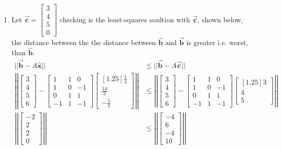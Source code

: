 \documentclass[letter,11pt]{article}
\theoremstyle{definition}
\begin{document}
\begin{tcolorbox}[boxrule=1mm,enhanced jigsaw, breakable,before=\hfill,after=\hfill,adjusted title={Problem 5 solutions}]
\begin{enumerate}[label = \roman*.]
        \item Let $\vec{\boldsymbol{c}} = \begin{bmatrix} 3 \\ 4 \\ 5 \\ 0 \end{bmatrix}$ checking is the least-squares soultion with $\vec{\boldsymbol{c}}$, shown below, the distance between the the distance between $\hat{\boldsymbol{b}}$ and $\vec{\boldsymbol{b}}$ is greater i.e. worst, than $\hat{\boldsymbol{b}}$.
        \begin{align*}
            ||\vec{\boldsymbol{b}}-A\hat{\boldsymbol{x}}|| &\leq ||\vec{\boldsymbol{b}} - A\vec{\boldsymbol{c}}||\\
            \left|\left| \begin{bmatrix} 3 \\ 4 \\ 5 \\ 6 \end{bmatrix} - \begin{bmatrix}1 & 1 & 0 \\ 1 & 0 & -1 \\ 0 & 1 & 1 \\ -1 & 1 & -1 \end{bmatrix}\begin{bmatrix}[1.25] \frac{1}{3} \\ \frac{14}{3} \\ -\frac{5}{3} \end{bmatrix} \right|\right| & \leq \left|\left| \begin{bmatrix} 3 \\ 4 \\ 5 \\ 6 \end{bmatrix} - \begin{bmatrix}1 & 1 & 0 \\ 1 & 0 & -1 \\ 0 & 1 & 1 \\ -1 & 1 & -1 \end{bmatrix}\begin{bmatrix}[1.25] 3 \\ 4 \\ 5 \end{bmatrix} \right|\right| \\ 
            \left|\left| \begin{bmatrix} -2 \\ 2 \\ 2 \\ 0 \end{bmatrix}  \right|\right| & \leq \left|\left|\begin{bmatrix} -4 \\ 6 \\ -4 \\ 10 \end{bmatrix} \right|\right|\\

\end{align*}
\end{enumerate}
\end{tcolorbox}
\end{document}
